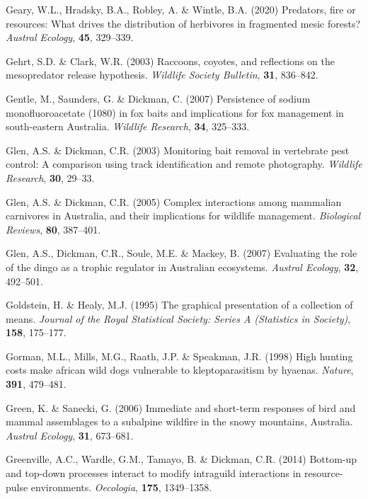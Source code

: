 \documentclass[11pt,a4paper,titlepage,twoside,openright]{style/unimelbthesis}
\begin{document}
\begin{mainmatter}
\leavevmode\hypertarget{ref-geary2020predators}{}%
Geary, W.L., Hradsky, B.A., Robley, A. \& Wintle, B.A. (2020) Predators, fire or resources: What drives the distribution of herbivores in fragmented mesic forests? \emph{Austral Ecology}, \textbf{45}, 329--339.

\leavevmode\hypertarget{ref-gehrt2003raccoons}{}%
Gehrt, S.D. \& Clark, W.R. (2003) Raccoons, coyotes, and reflections on the mesopredator release hypothesis. \emph{Wildlife Society Bulletin}, \textbf{31}, 836--842.

\leavevmode\hypertarget{ref-gentle2007persistence}{}%
Gentle, M., Saunders, G. \& Dickman, C. (2007) Persistence of sodium monofluoroacetate (1080) in fox baits and implications for fox management in south-eastern Australia. \emph{Wildlife Research}, \textbf{34}, 325--333.

\leavevmode\hypertarget{ref-glen2003monitoring}{}%
Glen, A.S. \& Dickman, C.R. (2003) Monitoring bait removal in vertebrate pest control: A comparison using track identification and remote photography. \emph{Wildlife Research}, \textbf{30}, 29--33.

\leavevmode\hypertarget{ref-glen2005complex}{}%
Glen, A.S. \& Dickman, C.R. (2005) Complex interactions among mammalian carnivores in Australia, and their implications for wildlife management. \emph{Biological Reviews}, \textbf{80}, 387--401.

\leavevmode\hypertarget{ref-glen2007evaluating}{}%
Glen, A.S., Dickman, C.R., Soule, M.E. \& Mackey, B. (2007) Evaluating the role of the dingo as a trophic regulator in Australian ecosystems. \emph{Austral Ecology}, \textbf{32}, 492--501.

\leavevmode\hypertarget{ref-goldstein1995graphical}{}%
Goldstein, H. \& Healy, M.J. (1995) The graphical presentation of a collection of means. \emph{Journal of the Royal Statistical Society: Series A (Statistics in Society)}, \textbf{158}, 175--177.

\leavevmode\hypertarget{ref-gorman1998high}{}%
Gorman, M.L., Mills, M.G., Raath, J.P. \& Speakman, J.R. (1998) High hunting costs make african wild dogs vulnerable to kleptoparasitism by hyaenas. \emph{Nature}, \textbf{391}, 479--481.

\leavevmode\hypertarget{ref-green2006immediate}{}%
Green, K. \& Sanecki, G. (2006) Immediate and short-term responses of bird and mammal assemblages to a subalpine wildfire in the snowy mountains, Australia. \emph{Austral Ecology}, \textbf{31}, 673--681.

\leavevmode\hypertarget{ref-greenville2014bottom}{}%
Greenville, A.C., Wardle, G.M., Tamayo, B. \& Dickman, C.R. (2014) Bottom-up and top-down processes interact to modify intraguild interactions in resource-pulse environments. \emph{Oecologia}, \textbf{175}, 1349--1358.


\end{mainmatter}
\end{document}
